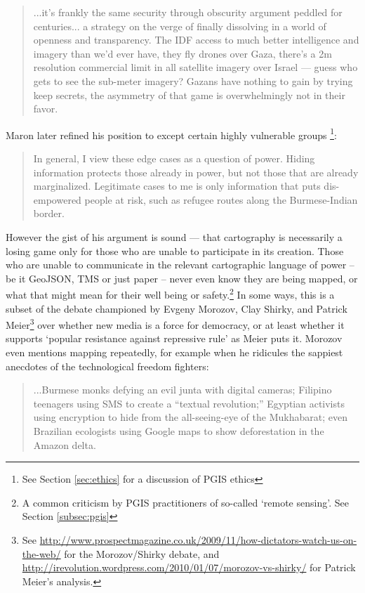 \documentclass[11pt,oneside,notitlepage]{report}
\begin{document}
\begin{quote}
...it's frankly the same security through obscurity argument peddled for centuries... a strategy on the verge of finally dissolving in a world of openness and transparency. The IDF access to much better intelligence and imagery than we'd ever have, they fly drones over Gaza, there's a 2m resolution commercial limit in all satellite imagery over Israel — guess who gets to see the sub-meter imagery? Gazans have nothing to gain by trying keep secrets, the asymmetry of that game is overwhelmingly not in their favor. \cite{maron2009misconceptions}
\end{quote}

Maron later refined his position to except certain highly vulnerable groups \footnote{See Section \ref{sec:ethics} for a discussion of PGIS ethics}:

\begin{quote}
In general, I view these edge cases as a question of power. Hiding information protects those already in power, but not those that are already marginalized. Legitimate cases to me is only information that puts dis-empowered people at risk, such as refugee routes along the Burmese-Indian border. \cite{maron2010freedom}
\end{quote}

However the gist of his argument is sound --- that cartography is necessarily a losing game only for those who are unable to participate in its creation. Those who are unable to communicate in the relevant cartographic language of power -- be it GeoJSON, \ac{TMS} or just paper -- never even know they are being mapped, or what that might mean for their well being or safety.\footnote{A common criticism by PGIS practitioners of so-called `remote sensing'. See Section \ref{subsec:pgis}} In some ways, this is a subset of the debate championed by Evgeny Morozov, Clay Shirky, and Patrick Meier\footnote{See \url{http://www.prospectmagazine.co.uk/2009/11/how-dictators-watch-us-on-the-web/} for the Morozov/Shirky debate, and \url{http://irevolution.wordpress.com/2010/01/07/morozov-vs-shirky/} for Patrick Meier's analysis.} over whether new media is a force for democracy, or at least whether it supports `popular resistance against repressive rule' as Meier puts it. \cite{meier2010popular} Morozov even mentions mapping repeatedly, for example when he ridicules the sappiest anecdotes of the technological freedom fighters: 
 
\begin{quote}
...Burmese monks defying an evil junta with digital cameras; Filipino teenagers using SMS to create a “textual revolution;” Egyptian activists using encryption to hide from the all-seeing-eye of the Mukhabarat; even Brazilian ecologists using Google maps to show deforestation in the Amazon delta. \cite{morozov2009dictators}
\end{quote}
\end{document}
